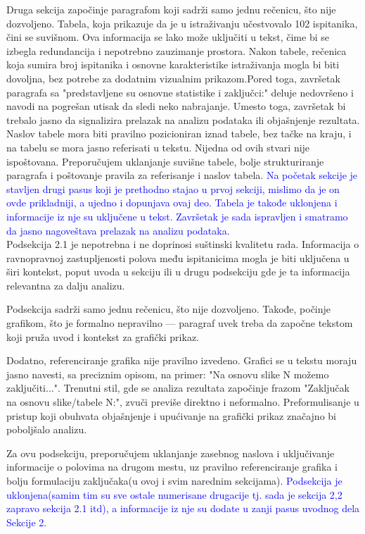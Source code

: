 \documentclass[a4paper]{report}
\newcommand{\odgovor}[1]{\textcolor{blue}{#1}}
\begin{document}
Druga sekcija započinje paragrafom koji sadrži samo jednu rečenicu, što nije dozvoljeno. Tabela, koja prikazuje da je u istraživanju učestvovalo 102 ispitanika, čini se suvišnom. Ova informacija se lako može uključiti u tekst, čime bi se izbegla redundancija i nepotrebno zauzimanje prostora. Nakon tabele, rečenica koja sumira broj ispitanika i osnovne karakteristike istraživanja mogla bi biti dovoljna, bez potrebe za dodatnim vizualnim prikazom.Pored toga, završetak paragrafa sa "predstavljene su osnovne statistike i zaključci:" deluje nedovršeno i navodi na pogrešan utisak da sledi neko nabrajanje. Umesto toga, završetak bi trebalo jasno da signalizira prelazak na analizu podataka ili objašnjenje rezultata. Naslov tabele mora biti pravilno pozicioniran iznad tabele, bez tačke na kraju, i na tabelu se mora jasno referisati u tekstu. Nijedna od ovih stvari nije ispoštovana.
Preporučujem uklanjanje suvišne tabele, bolje strukturiranje paragrafa i poštovanje pravila za referisanje i naslov tabela. \odgovor{Na početak sekcije je stavljen drugi pasus koji je prethodno stajao u prvoj sekciji, mislimo da je on ovde prikladniji, a ujedno i dopunjava ovaj deo. Tabela je takođe uklonjena i informacije iz nje su uključene u tekst. Završetak je sada ispravljen i smatramo da jasno nagoveštava prelazak na analizu podataka.} \\

Podsekcija 2.1 je nepotrebna i ne doprinosi suštinski kvalitetu rada. Informacija o ravnopravnoj zastupljenosti polova među ispitanicima mogla je biti uključena u širi kontekst, poput uvoda u sekciju ili u drugu podsekciju gde je ta informacija relevantna za dalju analizu. 

Podsekcija sadrži samo jednu rečenicu, što nije dozvoljeno. Takođe, počinje grafikom, što je formalno nepravilno — paragraf uvek treba da započne tekstom koji pruža uvod i kontekst za grafički prikaz.

Dodatno, referenciranje grafika nije pravilno izvedeno. Grafici se u tekstu moraju jasno navesti, sa preciznim opisom, na primer: "Na osnovu slike N možemo zaključiti...". Trenutni stil, gde se analiza rezultata započinje frazom "Zaključak na osnovu slike/tabele N:", zvuči previše direktno i neformalno. Preformulisanje u pristup koji obuhvata objašnjenje i upućivanje na grafički prikaz značajno bi poboljšalo analizu.

Za ovu podsekciju, preporučujem uklanjanje zasebnog naslova i uključivanje informacije o polovima na drugom mestu, uz pravilno referenciranje grafika i bolju formulaciju zaključaka(u ovoj i svim narednim sekcijama). \odgovor{Podsekcija je uklonjena(samim tim su sve ostale numerisane drugacije tj. sada je sekcija 2,2 zapravo sekcija 2.1 itd), a informacije iz nje su dodate u zanji pasus uvodnog dela Sekcije 2.}\\
\end{document}
